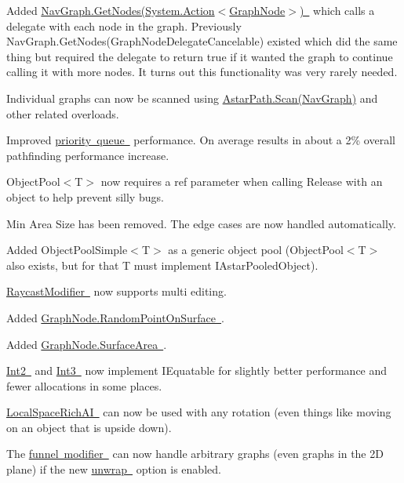 \begin{DoxyItemize}
\begin{DoxyItemize}
\begin{DoxyItemize}
\begin{DoxyItemize}
\item Added \mbox{\hyperlink{class_pathfinding_1_1_nav_graph_a362fe9b5f2b34ce2072cd2fe3ae9df41}{Nav\+Graph.\+Get\+Nodes(System.\+Action$<$\+Graph\+Node$>$) }} which calls a delegate with each node in the graph. Previously Nav\+Graph.\+Get\+Nodes(\+Graph\+Node\+Delegate\+Cancelable) existed which did the same thing but required the delegate to return true if it wanted the graph to continue calling it with more nodes. It turns out this functionality was very rarely needed.
\item Individual graphs can now be scanned using \mbox{\hyperlink{class_astar_path_a9751550dc6954212dcb2e03aecafbcf6}{Astar\+Path.\+Scan(\+Nav\+Graph)}} and other related overloads.
\item Improved \mbox{\hyperlink{class_pathfinding_1_1_binary_heap}{priority queue }} performance. On average results in about a 2\% overall pathfinding performance increase.
\item Object\+Pool$<$\+T$>$ now requires a ref parameter when calling Release with an object to help prevent silly bugs.
\item \textquotesingle{}Min Area Size\textquotesingle{} has been removed. The edge cases are now handled automatically.
\item Added Object\+Pool\+Simple$<$\+T$>$ as a generic object pool (Object\+Pool$<$\+T$>$ also exists, but for that T must implement I\+Astar\+Pooled\+Object).
\item \mbox{\hyperlink{class_pathfinding_1_1_raycast_modifier}{Raycast\+Modifier }} now supports multi editing.
\item Added \mbox{\hyperlink{class_pathfinding_1_1_graph_node_a2b0bbdba619e80c979ae6e4baf70f153}{Graph\+Node.\+Random\+Point\+On\+Surface }}.
\item Added \mbox{\hyperlink{class_pathfinding_1_1_graph_node_a38397e222f65563d3db6d66e8aacbbbd}{Graph\+Node.\+Surface\+Area }}.
\item \mbox{\hyperlink{struct_pathfinding_1_1_int2}{Int2 }} and \mbox{\hyperlink{struct_pathfinding_1_1_int3}{Int3 }} now implement I\+Equatable for slightly better performance and fewer allocations in some places.
\item \mbox{\hyperlink{}{Local\+Space\+Rich\+AI }} can now be used with any rotation (even things like moving on an object that is upside down).
\item The \mbox{\hyperlink{class_pathfinding_1_1_funnel_modifier}{funnel modifier }} can now handle arbitrary graphs (even graphs in the 2D plane) if the new \mbox{\hyperlink{class_pathfinding_1_1_funnel_modifier_a01e517457a43758bc49d92f4a16e3430}{unwrap }} option is enabled.

\end{DoxyItemize}
\end{DoxyItemize}
\end{DoxyItemize}
\end{DoxyItemize}
